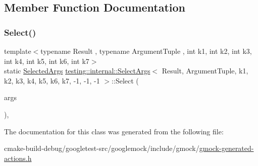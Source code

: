 \subsection{Member Function Documentation}
\mbox{\label{classtesting_1_1internal_1_1SelectArgs_3_01Result_00_01ArgumentTuple_00_01k1_00_01k2_00_01k3_00_39929402cb68b57f60e280a41eb60fed_a0cf7d28342dd284de849c9776387c192}} 
\subsubsection{\texorpdfstring{Select()}{Select()}}
{\footnotesize\ttfamily template$<$typename Result , typename Argument\+Tuple , int k1, int k2, int k3, int k4, int k5, int k6, int k7$>$ \\
static \mbox{\hyperlink{classtesting_1_1internal_1_1SelectArgs_3_01Result_00_01ArgumentTuple_00_01k1_00_01k2_00_01k3_00_39929402cb68b57f60e280a41eb60fed_a128e1c494007a7bffd3d0a88a4dd7825}{Selected\+Args}} \mbox{\hyperlink{classtesting_1_1internal_1_1SelectArgs}{testing\+::internal\+::\+Select\+Args}}$<$ Result, Argument\+Tuple, k1, k2, k3, k4, k5, k6, k7, -\/1, -\/1, -\/1 $>$\+::Select (\begin{DoxyParamCaption}\item[{const Argument\+Tuple \&}]{args }\end{DoxyParamCaption})\hspace{0.3cm}{\ttfamily [inline]}, {\ttfamily [static]}}



The documentation for this class was generated from the following file\+:\begin{DoxyCompactItemize}
\item 
cmake-\/build-\/debug/googletest-\/src/googlemock/include/gmock/\mbox{\hyperlink{gmock-generated-actions_8h}{gmock-\/generated-\/actions.\+h}}\end{DoxyCompactItemize}
